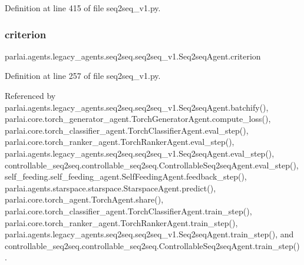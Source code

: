 Definition at line 415 of file seq2seq\+\_\+v1.\+py.

\mbox{\label{classparlai_1_1agents_1_1legacy__agents_1_1seq2seq_1_1seq2seq__v1_1_1Seq2seqAgent_a821dfcf56b6872f4377b0fc8c5ed94de}} 
\subsubsection{\texorpdfstring{criterion}{criterion}}
{\footnotesize\ttfamily parlai.\+agents.\+legacy\+\_\+agents.\+seq2seq.\+seq2seq\+\_\+v1.\+Seq2seq\+Agent.\+criterion}



Definition at line 257 of file seq2seq\+\_\+v1.\+py.



Referenced by parlai.\+agents.\+legacy\+\_\+agents.\+seq2seq.\+seq2seq\+\_\+v1.\+Seq2seq\+Agent.\+batchify(), parlai.\+core.\+torch\+\_\+generator\+\_\+agent.\+Torch\+Generator\+Agent.\+compute\+\_\+loss(), parlai.\+core.\+torch\+\_\+classifier\+\_\+agent.\+Torch\+Classifier\+Agent.\+eval\+\_\+step(), parlai.\+core.\+torch\+\_\+ranker\+\_\+agent.\+Torch\+Ranker\+Agent.\+eval\+\_\+step(), parlai.\+agents.\+legacy\+\_\+agents.\+seq2seq.\+seq2seq\+\_\+v1.\+Seq2seq\+Agent.\+eval\+\_\+step(), controllable\+\_\+seq2seq.\+controllable\+\_\+seq2seq.\+Controllable\+Seq2seq\+Agent.\+eval\+\_\+step(), self\+\_\+feeding.\+self\+\_\+feeding\+\_\+agent.\+Self\+Feeding\+Agent.\+feedback\+\_\+step(), parlai.\+agents.\+starspace.\+starspace.\+Starspace\+Agent.\+predict(), parlai.\+core.\+torch\+\_\+agent.\+Torch\+Agent.\+share(), parlai.\+core.\+torch\+\_\+classifier\+\_\+agent.\+Torch\+Classifier\+Agent.\+train\+\_\+step(), parlai.\+core.\+torch\+\_\+ranker\+\_\+agent.\+Torch\+Ranker\+Agent.\+train\+\_\+step(), parlai.\+agents.\+legacy\+\_\+agents.\+seq2seq.\+seq2seq\+\_\+v1.\+Seq2seq\+Agent.\+train\+\_\+step(), and controllable\+\_\+seq2seq.\+controllable\+\_\+seq2seq.\+Controllable\+Seq2seq\+Agent.\+train\+\_\+step().

\mbox{\label{classparlai_1_1agents_1_1legacy__agents_1_1seq2seq_1_1seq2seq__v1_1_1Seq2seqAgent_a8636132dae633a66cc34da3a20d9894a}} 
